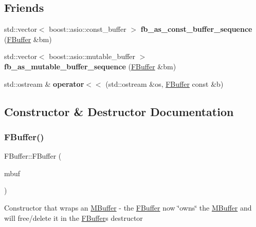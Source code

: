 \subsection*{Friends}
\begin{DoxyCompactItemize}
\item 
\mbox{\label{class_f_buffer_a2a832c78617be463503bceec23b2e773}} 
std\+::vector$<$ boost\+::asio\+::const\+\_\+buffer $>$ {\bfseries fb\+\_\+as\+\_\+const\+\_\+buffer\+\_\+sequence} (\hyperlink{class_f_buffer}{F\+Buffer} \&bm)
\item 
\mbox{\label{class_f_buffer_a3e2bb2caacfd3d4795212913c14c277b}} 
std\+::vector$<$ boost\+::asio\+::mutable\+\_\+buffer $>$ {\bfseries fb\+\_\+as\+\_\+mutable\+\_\+buffer\+\_\+sequence} (\hyperlink{class_f_buffer}{F\+Buffer} \&bm)
\item 
\mbox{\label{class_f_buffer_a96fce1073312fb0ff79ae8b2ae78451e}} 
std\+::ostream \& {\bfseries operator$<$$<$} (std\+::ostream \&os, \hyperlink{class_f_buffer}{F\+Buffer} const \&b)
\end{DoxyCompactItemize}


\subsection{Constructor \& Destructor Documentation}
\mbox{\label{class_f_buffer_a3aac6ae74811d7c6d3902ad5c1fdcab3}} 
\subsubsection{\texorpdfstring{F\+Buffer()}{FBuffer()}\hspace{0.1cm}{\footnotesize\ttfamily [1/2]}}
{\footnotesize\ttfamily F\+Buffer\+::\+F\+Buffer (\begin{DoxyParamCaption}\item[{\hyperlink{struct_m_buffer}{M\+Buffer} $\ast$}]{mbuf }\end{DoxyParamCaption})}

Constructor that wraps an \hyperlink{struct_m_buffer}{M\+Buffer} -\/ the \hyperlink{class_f_buffer}{F\+Buffer} now \char`\"{}owns\char`\"{} the \hyperlink{struct_m_buffer}{M\+Buffer} and will free/delete it in the \hyperlink{class_f_buffer}{F\+Buffer}\textquotesingle{}s destructor \mbox{\label{class_f_buffer_a89680be41fb35ea1b9591ca646713f2f}} 
